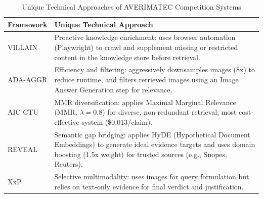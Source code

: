 \begin{table}[ht]
\centering
\caption{Unique Technical Approaches of AVERIMATEC Competition Systems}
\label{tab:competition-systems-unique-approaches}
\begin{tabular}{|l|p{10cm}|}
\hline
\textbf{Framework} & \textbf{Unique Technical Approach} \\
\hline
VILLAIN & Proactive knowledge enrichment: uses browser automation (Playwright) to crawl and supplement missing or restricted content in the knowledge store before retrieval. \\
ADA-AGGR & Efficiency and filtering: aggressively downsamples images (8x) to reduce runtime, and filters retrieved images using an Image Answer Generation step for relevance. \\
AIC CTU & MMR diversification: applies Maximal Marginal Relevance (MMR, $\lambda=0.8$) for diverse, non-redundant retrieval; most cost-effective system (\$0.013/claim). \\
REVEAL & Semantic gap bridging: applies HyDE (Hypothetical Document Embeddings) to generate ideal evidence targets and uses domain boosting (1.5x weight) for trusted sources (e.g., Snopes, Reuters). \\
XxP & Selective multimodality: uses images for query formulation but relies on text-only evidence for final verdict and justification. \\
\hline
\end{tabular}
\end{table}

\begin{table}[ht]
\centering
\caption{Comparison of AVerImaTeC Competition Systems}
\label{tab:competition-systems-comparison}

\end{table}




